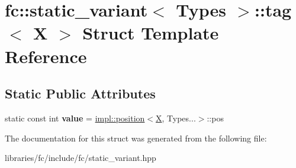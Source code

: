 \hypertarget{structfc_1_1static__variant_1_1tag}{}\section{fc\+:\+:static\+\_\+variant$<$ Types $>$\+:\+:tag$<$ X $>$ Struct Template Reference}
\label{structfc_1_1static__variant_1_1tag}
\subsection*{Static Public Attributes}
\begin{DoxyCompactItemize}
\item 
\mbox{\label{structfc_1_1static__variant_1_1tag_aa067086e9db16132f0ff6d13dcdf2b4c}} 
static const int {\bfseries value} = \mbox{\hyperlink{structfc_1_1impl_1_1position}{impl\+::position}}$<$\mbox{\hyperlink{class_x}{X}}, Types...$>$\+::pos
\end{DoxyCompactItemize}


The documentation for this struct was generated from the following file\+:\begin{DoxyCompactItemize}
\item 
libraries/fc/include/fc/static\+\_\+variant.\+hpp\end{DoxyCompactItemize}
